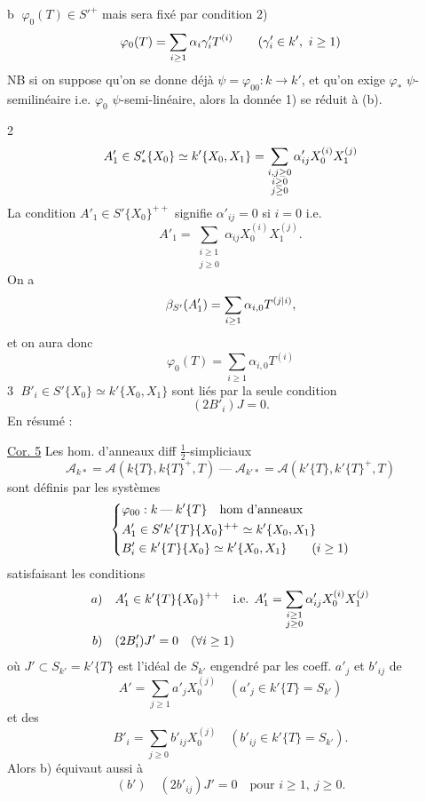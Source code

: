 \textcircled{b} $\varphi_0(T)\in S'^+$  mais sera fixé par condition 2)
\[
 {\varphi_0(T)=\sum_{i\geq1}{{\alpha_i}}\gamma'_iT^{(i)}\qquad(\gamma'_i\in k',\ i\geq1)}
\]
 NB si on suppose qu'on se donne déjà $\psi=\varphi_{00}:k\longrightarrow k'$, et qu'on exige $\varphi_*$ $\psi$-semilinéaire i.e. $\varphi_0$ $\psi$-semi-linéaire, alors la donnée 1) se réduit à (b).

\textcircled{2}
\[
 A'_1\in S'_{{{*}}}\{X_0\}\simeq k'\{X_0,X_1\}
 =\sum_{\substack{{i,j\geq0}\\{{i\geq0}}\\j\geq0}}\alpha'_{ij}X_0^{(i)}X_1^{(j)}
\]
La condition $A'_1\in S'\{X_0\}^{++}$ signifie $\alpha'_{ij}=0$ si $i=0$
i.e.
\[
 A'_1=\sum_{\substack{i\geq1\\j\geq0}}\alpha_{ij}X_0^{(i)}X_1^{(j)}.
\]
On a
\[
 \beta_{S'}(A'_1)=\sum_{i\geq1}\alpha_{i,0}T^{({j|i})},
\]
et on aura donc
\[
 \varphi_0(T)=\sum_{i\geq1}\alpha_{i,0}T^{(i)}
\]
\textcircled{3} $B'_i\in S'\{X_0\}\simeq k'\{X_0,X_1\}$ sont liés par la seule condition
\[
 (2B'_i)J=0.
\]
En résumé :

\uline{Cor. 5} Les hom. d'anneaux diff $\tfrac12$-simpliciaux
\[
 \mathcal A_{k*}=\mathcal A(k\{T\},k\{T\}^+,T)\mathbin{\text{---}}\mathcal A_{k'*}=\mathcal A(k'\{T\},k'\{T\}^+,T)
\]
sont définis par les systèmes 
\[
 \left\{\begin{aligned}
 &\varphi_{00}:k\mathbin{\text{---}}k'\{T\}\quad\text{hom d'anneaux}\\
 &A'_{{1}}\in{{S'}}k'\{T\}\{X_0\}^{{++}}\simeq k'\{X_0,X_1\}\\
 &B'_i\in k'\{T\}\{X_0\}\simeq k'\{X_0,X_1\}\qquad(i\geq1)
 \end{aligned}\right.
\]
satisfaisant les conditions
\[
 \begin{aligned}
 a)\quad&A'_{{1}}\in k'\{T\}\{X_0\}^{++}\quad\text{i.e. }A'_{{1}}=\sum_{\substack{i\geq1\\j\geq0}}\alpha'_{ij}X_0^{(i)}X_1^{(j)}\\
 b)\quad&(2B'_i)J'=0\quad(\forall i\geq1)
 \end{aligned}
\]
où $J'\subset S_{k'}=k'\{T\}$ est l'idéal de $S_{k'}$ engendré par les coeff. $a'_j$ et $b'_{ij}$
de
\[
 A'=\sum_{j\geq1}a'_jX_0^{(j)}\quad(a'_j\in k'\{T\}=S_{k'})
\]
et des
\[
 B'_i=\sum_{j\geq0}b'_{ij}X_0^{(j)}\quad(b'_{ij}\in k'\{T\}=S_{k'}).
\]
Alors b) équivaut aussi à
\[
 (b')\quad(2b'_{ij})J'=0\quad\text{pour }i\geq1,\ j\geq0.
\]
